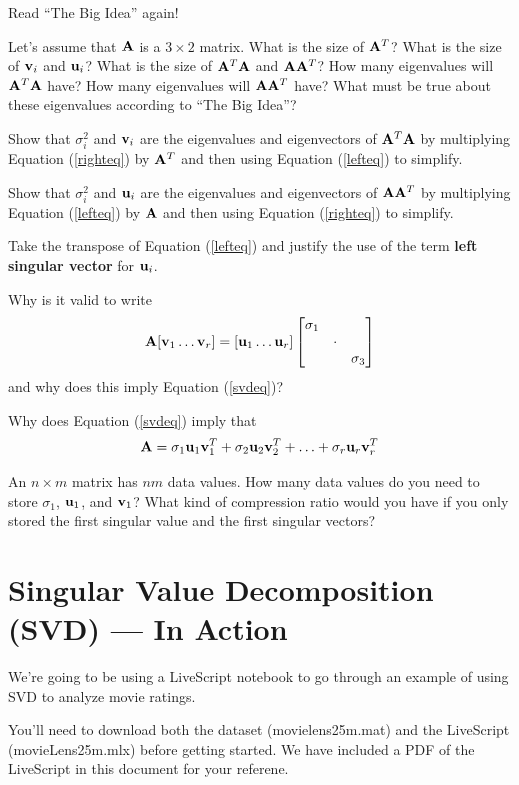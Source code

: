\begin{prob}
\be
\item Read ``The Big Idea'' again!
\item Let's assume that $\mathbf{A}$ is a $3 \times 2$ matrix. What is the size of $\mathbf{A}^T$? What is the size of $\mathbf{v}_i$ and $\mathbf{u}_i$? What is the size of $\mathbf{A}^T \mathbf{A}$ and $\mathbf{A} \mathbf{A}^T$? How many eigenvalues will $\mathbf{A}^T \mathbf{A}$ have? How many eigenvalues will $\mathbf{A} \mathbf{A}^T$ have? What must be true about these eigenvalues according to ``The Big Idea''?
\item Show that $\sigma_i^2$ and $\mathbf{v}_i$ are the eigenvalues and eigenvectors of $\mathbf{A}^T \mathbf{A}$ by multiplying Equation (\ref{righteq}) by $\mathbf{A}^T$ and then using Equation (\ref{lefteq}) to simplify.
\item Show that $\sigma_i^2$ and $\mathbf{u}_i$ are the eigenvalues and eigenvectors of $\mathbf{A} \mathbf{A}^T$ by multiplying Equation (\ref{lefteq}) by $\mathbf{A}$ and then using Equation (\ref{righteq}) to simplify.
\item Take the transpose of Equation (\ref{lefteq}) and justify the use of the term \textbf{left singular vector} for $\mathbf{u}_i$.
\item Why is it valid to write
\[\mathbf{A} [\mathbf{v}_1 \ldots \mathbf{v}_r] = [\mathbf{u}_1 \ldots \mathbf{u}_r] \begin{bmatrix} \sigma_1 &  &  \\  & \cdot &  \\  &  & \sigma_3 \end{bmatrix}\]
and why does this imply Equation (\ref{svdeq})?
\item Why does Equation (\ref{svdeq}) imply that 
\begin{equation}
\mathbf{A} = \sigma_1 \mathbf{u}_1 \mathbf{v}_1^T + \sigma_2 \mathbf{u}_2 \mathbf{v}_2^T + \ldots + \sigma_r \mathbf{u}_r \mathbf{v}_r^T
\end{equation}
\item An $n \times m$ matrix has $nm$ data values. How many data values do you need to store $\sigma_1$, $\mathbf{u}_1$, and $\mathbf{v}_1$? What kind of compression ratio would you have if you only stored the first singular value and the first singular vectors?
\ee
\end{prob}

\section{Singular Value Decomposition (SVD) --- In Action}

We're going to be using a LiveScript notebook to go through an example of using SVD to analyze movie ratings.

You'll need to download both the dataset (movielens25m.mat) and the LiveScript (movieLens25m.mlx) before getting started.  We have included a PDF of the LiveScript in this document for your referene.

